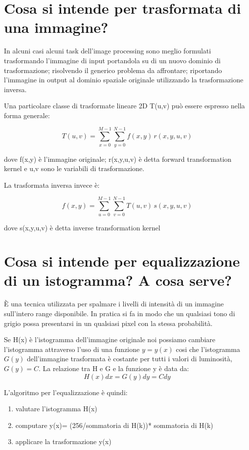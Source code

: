 \section{Cosa si intende per trasformata di una immagine?}

In alcuni casi alcuni task dell'image processing sono meglio formulati trasformando l'immagine di input portandola su di un nuovo dominio di trasformazione; risolvendo il generico problema da affrontare; riportando l'immagine in output al dominio spaziale originale utilizzando la trasformazione inversa.

Una particolare classe di trasformate lineare 2D T(u,v) può essere espresso nella forma generale:

$$
T(u,v) = \sum_{x=0}^{M-1} \sum_{y=0}^{N-1} f(x,y) \, r(x, y, u, v)
$$

dove f(x,y) è l'immagine originale; r(x,y,u,v) è detta forward transformation kernel e u,v sono le variabili di trasformazione.

La trasformata inversa invece è:

$$
f(x,y) = \sum_{u=0}^{M-1} \sum_{v=0}^{N-1} T(u,v) \, s(x, y, u, v)
$$

dove s(x,y,u,v) è detta inverse transformation kernel

\section{Cosa si intende per equalizzazione di un istogramma? A cosa serve?}
È una tecnica utilizzata per spalmare i livelli di intensità di un immagine sull'intero range disponibile. In pratica si fa in modo che un qualsiasi tono di grigio possa presentarsi in un qualsiasi pixel con la stessa probabilità.

Se H(x) è l'istogramma dell'immagine originale noi possiamo cambiare l'istogramma attraverso l'uso di una funzione $y=y(x)$ cosi che l'istogramma $G(y)$ dell'immagine trasformata è costante per tutti i valori di luminosità, $G(y) = C$. La relazione tra H e G e la funzione y è data da:
$$
H(x)dx = G(y)dy = Cdy
$$

L'algoritmo per l'equalizzazione è quindi:
\begin{enumerate}
	\item valutare l'istogramma H(x)
	\item computare y(x)= (256/sommatoria di H(k))* sommatoria di H(k)
	\item applicare la trasformazione y(x)
\end{enumerate}

